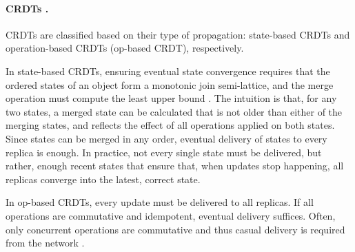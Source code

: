 
\paragraph{CRDTs \cite{crdt}.}
CRDTs are classified based on their type of propagation: state-based CRDTs and operation-based CRDTs (op-based CRDT), respectively.

In state-based CRDTs, ensuring eventual state convergence requires that the ordered states of an object form a monotonic join semi-lattice, and the merge operation must compute the least upper bound \cite{crdt, stateCRDT}. The intuition is that, for any two states, a merged state can be calculated that is not older than either of the merging states, and reflects the effect of all operations applied on both states.
Since states can be merged in any order, eventual delivery of states to every replica is enough.
In practice, not every single state must be delivered, but rather, enough recent states that ensure that, when updates stop happening, all replicas converge into the latest, correct state.%

In op-based CRDTs, every update must be delivered to all replicas.
If all operations are commutative and idempotent, eventual delivery suffices.
Often, only concurrent operations are commutative and thus casual delivery is required from the network \cite{understandingEC}. 

